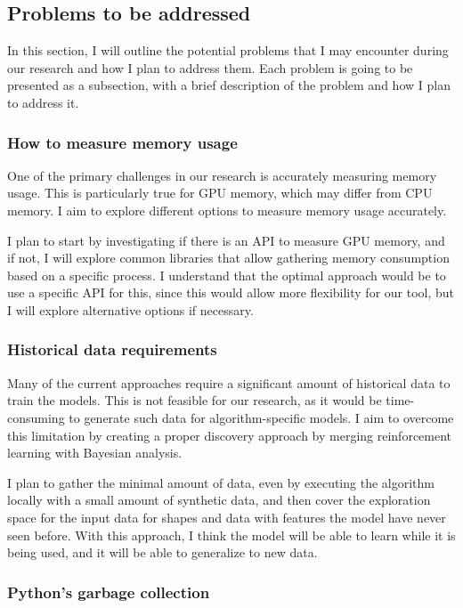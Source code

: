 \subsection{Problems to be addressed}
\label{subsec:problems-to-be-addressed}

In this section, I will outline the potential problems that I may encounter during our research and how I plan to address them.
Each problem is going to be presented as a subsection, with a brief description of the problem and how I plan to address it.

\subsubsection{How to measure memory usage}

One of the primary challenges in our research is accurately measuring memory usage.
This is particularly true for GPU memory, which may differ from CPU memory.
I aim to explore different options to measure memory usage accurately.

I plan to start by investigating if there is an API to measure GPU memory, and if not, I will explore common libraries that allow gathering memory consumption based on a specific process.
I understand that the optimal approach would be to use a specific API for this, since this would allow more flexibility for our tool, but I will explore alternative options if necessary.

\subsubsection{Historical data requirements}

Many of the current approaches require a significant amount of historical data to train the models.
This is not feasible for our research, as it would be time-consuming to generate such data for algorithm-specific models.
I aim to overcome this limitation by creating a proper discovery approach by merging reinforcement learning with Bayesian analysis.

I plan to gather the minimal amount of data, even by executing the algorithm locally with a small amount of synthetic data, and then cover the exploration space for the input data for shapes and data with features the model have never seen before.
With this approach, I think the model will be able to learn while it is being used, and it will be able to generalize to new data.

\subsubsection{Python's garbage collection}

